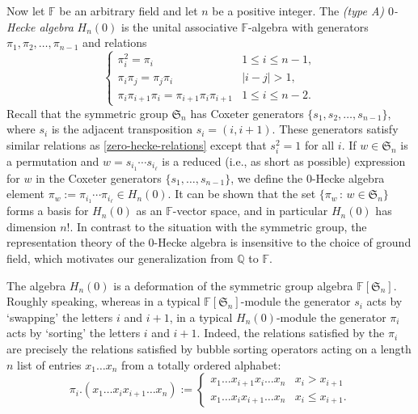 \documentclass[ALCO,ThmDefs,published]{cedram}
\newcommand{\symm}{{\mathfrak{S}}}
\newcommand{\QQ}{{\mathbb {Q}}}
\newcommand{\FF}{{\mathbb{F}}}
\theoremstyle{plain}
\newcommand{\symm}{{\mathfrak{S}}}
\newcommand{\QQ}{{\mathbb {Q}}}
\newcommand{\FF}{{\mathbb{F}}}
\newcommand{\pib}{\overline{\pi}}
\begin{document}
Now let $\FF$ be an arbitrary field and let $n$ be a positive integer.  
The 
\emph{(type A) $0$-Hecke algebra} $H_n(0)$ 
is the unital associative $\FF$-algebra with generators $\pi_1, \pi_2, \dots, \pi_{n-1}$ and relations
\begin{equation}
\label{zero-hecke-relations}
\begin{cases}
\pi_i^2 =  \pi_i & 1 \leq i \leq n-1, \\
\pi_i \pi_j = \pi_j \pi_i & |i - j| > 1,  \\
\pi_i \pi_{i+1} \pi_i = \pi_{i+1} \pi_i \pi_{i+1} & 1 \leq i \leq n-2.
\end{cases}
\end{equation}
Recall that the symmetric group $\symm_n$ has Coxeter generators $\{s_1, s_2, \dots, s_{n-1} \}$, where
$s_i$ is the adjacent transposition $s_i = (i, i+1)$.
These generators satisfy similar relations as \eqref{zero-hecke-relations} except that $s_i^2=1$ for all $i$. 
If $w \in \symm_n$ is a permutation and $w = s_{i_1} \cdots s_{i_{\ell}}$ is a reduced (i.e., as short as possible)
expression for $w$
in the Coxeter generators $\{s_1, \dots, s_{n-1}\}$, we define 
the 0-Hecke algebra element $\pi_w := \pi_{i_1} \cdots \pi_{i_{\ell}} \in H_n(0)$.  It can be shown that the 
set $\{ \pi_w \,:\, w \in \symm_n \}$ forms a basis for $H_n(0)$ as an $\FF$-vector space, and in particular
$H_n(0)$ has dimension $n!$. 
In contrast to the situation with the symmetric group, the representation theory of the 
0-Hecke algebra is insensitive to the choice of ground field, which motivates our generalization
from $\QQ$ to $\FF$.


The algebra $H_n(0)$ is a deformation of the symmetric group algebra
$\FF[\symm_n]$.  Roughly speaking, whereas in a typical $\FF[\symm_n]$-module the 
generator $s_i$ acts by `swapping' the letters $i$ and $i+1$, in a typical 
$H_n(0)$-module the generator $\pi_i$ acts by `sorting' the letters $i$ and $i+1$.
Indeed, the relations satisfied by the $\pi_i$ are precisely the relations satisfied by bubble sorting operators
acting on a length $n$ list of entries $x_1 \dots x_n$  from a totally ordered alphabet:
\begin{equation}
\pi_i .( x_1 \dots x_i x_{i+1} \dots x_n) := \begin{cases}
x_1 \dots x_{i+1} x_i \dots x_n & x_i > x_{i+1} \\
x_1 \dots x_i x_{i+1} \dots x_n & x_i \leq x_{i+1}.
\end{cases}
\end{equation}
\end{document}
